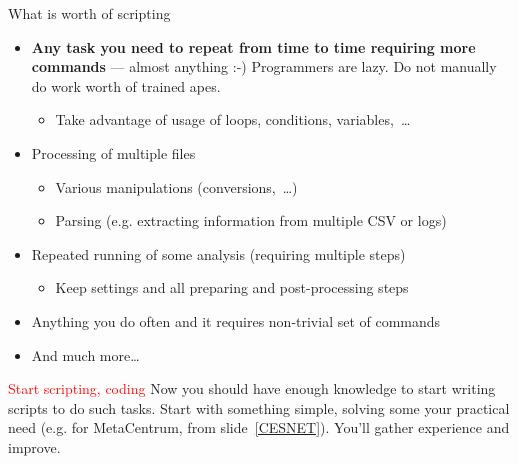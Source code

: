 \documentclass[compress, xelatex, 11pt, xcolor=svgnames, aspectratio=169,
	hyperref={
		bookmarks=true,
		unicode=true,
		colorlinks=true,
		pdftitle={Linux, command line and MetaCentrum},
		plainpages=false,
		pdfauthor={Vojtech Zeisek},
		pdfsubject={Course about use of Linux command line, writing shell scripts and using MetaCentrum of CESNET},
		pdfcreator={XeLaTeX},
		pdfkeywords={Linux, GNU, BASH, shell, command line, MetaCentrum},
		linkcolor=DarkRed, %
		anchorcolor=DarkBlue, %
		citecolor=Indigo, %
		filecolor=NavyBlue, %
		menucolor=DarkMagenta, %
		urlcolor=DarkBlue, %
		},
	url={hyphens, lowtilde} %
	]{beamer}
\renewcommand{\alert}[1]{\textcolor{red}{#1}}
\begin{document}
\begin{frame}{What is worth of scripting}
	\begin{itemize}
		\item \textbf{Any task you need to repeat from time to time requiring more commands} --- almost anything :-) Programmers are lazy. Do not manually do work worth of trained apes.
		\begin{itemize}
			\item Take advantage of usage of loops, conditions, variables,~\ldots
		\end{itemize}
		\item Processing of multiple files
		\begin{itemize}
			\item Various manipulations (conversions,~\ldots)
			\item Parsing (e.g. extracting information from multiple CSV or logs)
		\end{itemize}
		\item Repeated running of some analysis (requiring multiple steps)
		\begin{itemize}
			\item Keep settings and all preparing and post-processing steps
		\end{itemize}
		\item Anything you do often and it requires non-trivial set of commands
		\item And much more\ldots
	\end{itemize}
	\begin{block}{\alert{Start scripting, coding}}
		Now you should have enough knowledge to start writing scripts to do such tasks. Start with something simple, solving some your practical need (e.g. for MetaCentrum, from slide~\ref{CESNET}). You'll gather experience and improve.
	\end{block}
\end{frame}
\end{document}
